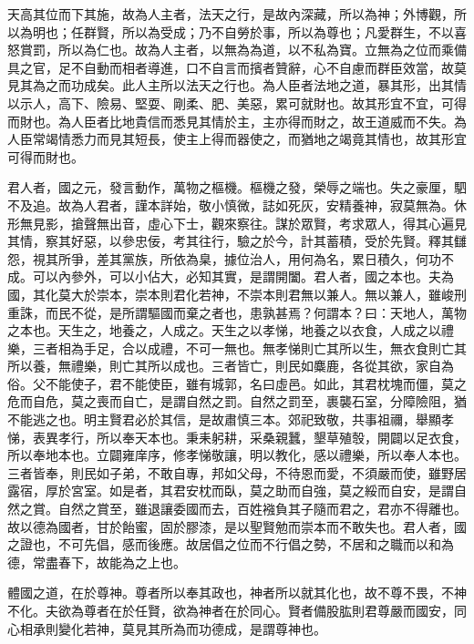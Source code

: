 
天高其位而下其施，故為人主者，法天之行，是故內深藏，所以為神；外博觀，所以為明也；任群賢，所以為受成；乃不自勞於事，所以為尊也；凡愛群生，不以喜怒賞罰，所以為仁也。故為人主者，以無為為道，以不私為寶。立無為之位而乘備具之官，足不自動而相者導進，口不自言而擯者贊辭，心不自慮而群臣效當，故莫見其為之而功成矣。此人主所以法天之行也。為人臣者法地之道，暴其形，出其情以示人，高下、險易、堅耍、剛柔、肥、美惡，累可就財也。故其形宜不宜，可得而財也。為人臣者比地貴信而悉見其情於主，主亦得而財之，故王道威而不失。為人臣常竭情悉力而見其短長，使主上得而器使之，而猶地之竭竟其情也，故其形宜可得而財也。


君人者，國之元，發言動作，萬物之樞機。樞機之發，榮辱之端也。失之豪厘，駟不及追。故為人君者，謹本詳始，敬小慎微，誌如死灰，安精養神，寂莫無為。休形無見影，搶聲無出音，虛心下士，觀來察往。謀於眾賢，考求眾人，得其心遍見其情，察其好惡，以參忠佞，考其往行，驗之於今，計其蓄積，受於先賢。釋其讎怨，視其所爭，差其黨族，所依為臬，據位治人，用何為名，累日積久，何功不成。可以內參外，可以小佔大，必知其實，是謂開闔。君人者，國之本也。夫為國，其化莫大於崇本，崇本則君化若神，不崇本則君無以兼人。無以兼人，雖峻刑重誅，而民不從，是所謂驅國而棄之者也，患孰甚焉？何謂本？曰：天地人，萬物之本也。天生之，地養之，人成之。天生之以孝悌，地養之以衣食，人成之以禮樂，三者相為手足，合以成禮，不可一無也。無孝悌則亡其所以生，無衣食則亡其所以養，無禮樂，則亡其所以成也。三者皆亡，則民如麋鹿，各從其欲，家自為俗。父不能使子，君不能使臣，雖有城郭，名曰虛邑。如此，其君枕塊而僵，莫之危而自危，莫之喪而自亡，是謂自然之罰。自然之罰至，裹襲石室，分障險阻，猶不能逃之也。明主賢君必於其信，是故肅慎三本。郊祀致敬，共事祖禰，舉顯孝悌，表異孝行，所以奉天本也。秉耒躬耕，采桑親蠶，墾草殖彀，開闢以足衣食，所以奉地本也。立闢雍庠序，修孝悌敬讓，明以教化，感以禮樂，所以奉人本也。三者皆奉，則民如子弟，不敢自專，邦如父母，不待恩而愛，不須嚴而使，雖野居露宿，厚於宮室。如是者，其君安枕而臥，莫之助而自強，莫之綏而自安，是謂自然之賞。自然之賞至，雖退讓委國而去，百姓襁負其子隨而君之，君亦不得離也。故以德為國者，甘於飴蜜，固於膠漆，是以聖賢勉而崇本而不敢失也。君人者，國之證也，不可先倡，感而後應。故居倡之位而不行倡之勢，不居和之職而以和為德，常盡春下，故能為之上也。

體國之道，在於尊神。尊者所以奉其政也，神者所以就其化也，故不尊不畏，不神不化。夫欲為尊者在於任賢，欲為神者在於同心。賢者備股肱則君尊嚴而國安，同心相承則變化若神，莫見其所為而功德成，是謂尊神也。

